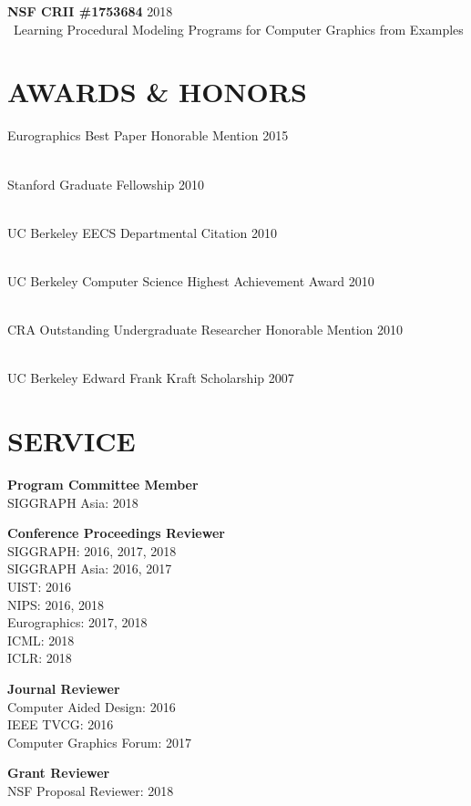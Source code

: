 \documentclass[line,margin]{res}
\begin{document}
\begin{resume}
\newcommand{\funding}[3] {
	\textbf{#1} \hfill #3\\\
	#2
}

\funding
{NSF CRII \#1753684}
{Learning Procedural Modeling Programs for Computer Graphics from Examples}
{2018}


\section{AWARDS \& HONORS}

\newcommand{\award}[2] {
	#1 \hfill #2
}

\award
{Eurographics Best Paper Honorable Mention}
{2015}
\\
\award
{Stanford Graduate Fellowship}
{2010}
\\
\award
{UC Berkeley EECS Departmental Citation}
{2010}
\\
\award
{UC Berkeley Computer Science Highest Achievement Award}
{2010}
\\
\award
{CRA Outstanding Undergraduate Researcher Honorable Mention}
{2010}
\\
\award
{UC Berkeley Edward Frank Kraft Scholarship}
{2007}


\section{SERVICE}

\textbf{Program Committee Member}\\
SIGGRAPH Asia: 2018

\textbf{Conference Proceedings Reviewer}\\
SIGGRAPH: 2016, 2017, 2018\\
SIGGRAPH Asia: 2016, 2017\\
UIST: 2016\\
NIPS: 2016, 2018\\
Eurographics: 2017, 2018\\
ICML: 2018\\
ICLR: 2018

\textbf{Journal Reviewer}\\
Computer Aided Design: 2016\\
IEEE TVCG: 2016\\
Computer Graphics Forum: 2017

\textbf{Grant Reviewer}\\
NSF Proposal Reviewer: 2018


\end{resume}
\end{document}
